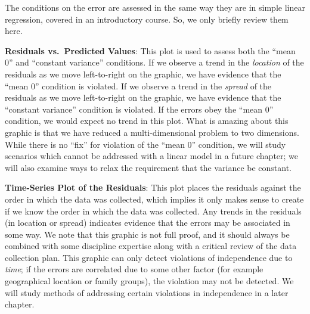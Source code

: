 \documentclass[
]{book}
\theoremstyle{plain}
\theoremstyle{mydefn}
\theoremstyle{myexmpl}
\theoremstyle{remark}
\begin{document}
\begin{table}

\caption{\label{tab:glm-assessing-conditions-residual-plots}Method of graphical assessment for the conditions of the classical regression model.}
\centering
{}
\end{table}

The conditions on the error are assessed in the same way they are in simple linear regression, covered in an introductory course. So, we only briefly review them here.

\textbf{Residuals vs.~Predicted Values}: This plot is used to assess both the ``mean 0'' and ``constant variance'' conditions. If we observe a trend in the \emph{location} of the residuals as we move left-to-right on the graphic, we have evidence that the ``mean 0'' condition is violated. If we observe a trend in the \emph{spread} of the residuals as we move left-to-right on the graphic, we have evidence that the ``constant variance'' condition is violated. If the errors obey the ``mean 0'' condition, we would expect no trend in this plot. What is amazing about this graphic is that we have reduced a multi-dimensional problem to two dimensions. While there is no ``fix'' for violation of the ``mean 0'' condition, we will study scenarios which cannot be addressed with a linear model in a future chapter; we will also examine ways to relax the requirement that the variance be constant.

\textbf{Time-Series Plot of the Residuals}: This plot places the residuals against the order in which the data was collected, which implies it only makes sense to create if we know the order in which the data was collected. Any trends in the residuals (in location or spread) indicates evidence that the errors may be associated in some way. We note that this graphic is not full proof, and it should always be combined with some discipline expertise along with a critical review of the data collection plan. This graphic can only detect violations of independence due to \emph{time}; if the errors are correlated due to some other factor (for example geographical location or family groups), the violation may not be detected. We will study methods of addressing certain violations in independence in a later chapter.
\end{document}
